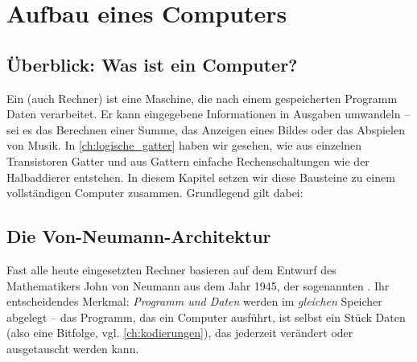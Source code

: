 \chapter[Aufbau eines Computers]{Aufbau eines Computers}\label{ch:aufbau_computer}

\section{Überblick: Was ist ein Computer?}

Ein  (auch Rechner) ist eine Maschine, die nach einem gespeicherten Programm Daten verarbeitet. Er kann eingegebene Informationen in Ausgaben umwandeln -- sei es das Berechnen einer Summe, das Anzeigen eines Bildes oder das Abspielen von Musik. In \cref{ch:logische_gatter} haben wir gesehen, wie aus einzelnen Transistoren Gatter und aus Gattern einfache Rechenschaltungen wie der Halbaddierer entstehen. In diesem Kapitel setzen wir diese Bausteine zu einem vollständigen Computer zusammen. Grundlegend gilt dabei:

\begin{center}
\end{center}

\section{Die Von-Neumann-Architektur}

Fast alle heute eingesetzten Rechner basieren auf dem Entwurf des Mathematikers John von Neumann aus dem Jahr 1945, der sogenannten . Ihr entscheidendes Merkmal: \emph{Programm und Daten} werden im \emph{gleichen} Speicher abgelegt -- das Programm, das ein Computer ausführt, ist selbst ein Stück Daten (also eine Bitfolge, vgl. \cref{ch:kodierungen}), das jederzeit verändert oder ausgetauscht werden kann.

